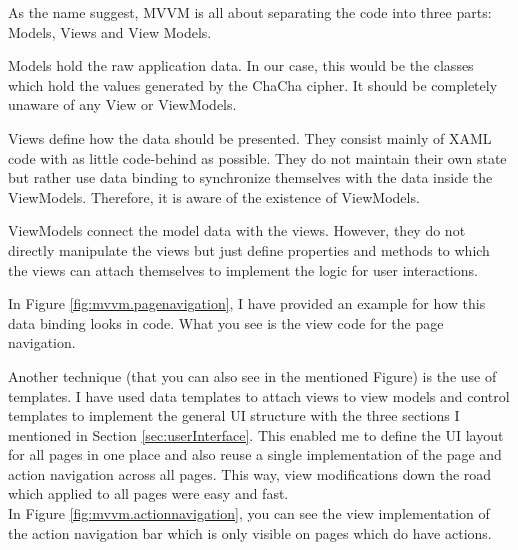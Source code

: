 As the name suggest, MVVM is all about separating the code into three parts: Models, Views and View Models.

Models hold the raw application data. In our case, this would be the classes which hold the values generated by the ChaCha cipher. It should be completely unaware of any View or ViewModels.

Views define how the data should be presented. They consist mainly of XAML code with as little code-behind as possible. They do not maintain their own state but rather use data binding to synchronize themselves with the data inside the ViewModels. Therefore, it is aware of the existence of ViewModels.

ViewModels connect the model data with the views. However, they do not directly manipulate the views but just define properties and methods to which the views can attach themselves to implement the logic for user interactions.

In Figure \ref{fig:mvvm.pagenavigation}, I have provided an example for how this data binding looks in code. What you see is the view code for the page navigation.

Another technique (that you can also see in the mentioned Figure) is the use of templates. I have used data templates to attach views to view models and control templates to implement the general UI structure with the three sections I mentioned in Section \ref{sec:userInterface}. This enabled me to define the UI layout for all pages in one place and also reuse a single implementation of the page and action navigation across all pages. This way, view modifications down the road which applied to all pages were easy and fast. \\ In Figure \ref{fig:mvvm.actionnavigation}, you can see the view implementation of the action navigation bar which is only visible on pages which do have actions.

